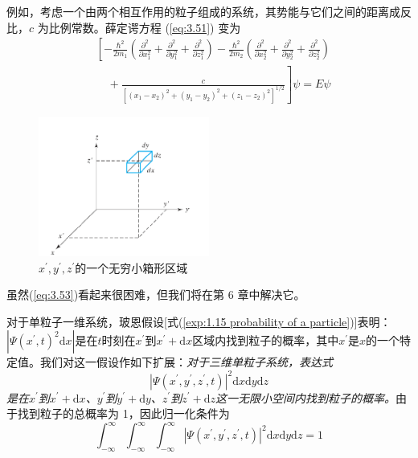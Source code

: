 	例如，考虑一个由两个相互作用的粒子组成的系统，其势能与它们之间的距离成反比，$c$ 为比例常数。薛定谔方程 (\ref{eq:3.51}) 变为
	\begin{equation}
		\begin{aligned}
			&\left[-\frac{\hbar^2}{2m_1}\left(\frac{\partial^2}{\partial x_1^2} + \frac{\partial^2}{\partial y_1^2} + \frac{\partial^2}{\partial z_1^2}\right) - \frac{\hbar^2}{2m_2}\left(\frac{\partial^2}{\partial x_2^2} + \frac{\partial^2}{\partial y_2^2} + \frac{\partial^2}{\partial z_2^2}\right) \right.\\
			&\quad + \left. \frac{c}{\left[\left(x_1-x_2\right)^2+\left(y_1-y_2\right)^2+\left(z_1-z_2\right)^2\right]^{1/2}}\right]\psi = E\psi
		\end{aligned}
		\label{eq:3.53}
	\end{equation}
	\begin{figure}[h!]
		\centering
		\includegraphics[width=0.5\textwidth]{Figures/3.1.png}  %
		\caption{$x^{\prime}, y^{\prime},z^{\prime}$的一个无穷小箱形区域}
		\label{fig:3.1}
	\end{figure}
	虽然(\ref{eq:3.53})看起来很困难，但我们将在第 6 章中解决它。

	对于单粒子一维系统，玻恩假设[式(\ref{exp:1.15 probability of a particle})]表明：$\left|\Psi\left(x^{\prime},t\right)^2\mathrm{d}x\right|$是在$t$时刻在$x^{\prime}$到$x^{\prime}+\mathrm{d}x$区域内找到粒子的概率，其中$x^{\prime}$是$x$的一个特定值。我们对这一假设作如下扩展：\textit{对于三维单粒子系统，表达式}
	\begin{equation}
		\boxed{
			\left|\Psi\left(x^{\prime}, y^{\prime}, z^{\prime},t\right)\right|^2 \mathrm{d}x\mathrm{d}y\mathrm{d}z
		}
		\label{exp:3.54}
	\end{equation}
	\textit{是在$x^{\prime}$到$x^{\prime}+\mathrm{d}x$、$y^{\prime}$到$y^{\prime}+\mathrm{d}y$、$z^{\prime}$到$z^{\prime}+\mathrm{d}z$这一无限小空间内找到粒子的概率。}由于找到粒子的总概率为 1，因此归一化条件为
	\begin{equation}
		\int_{-\infty}^{\infty}\int_{-\infty}^{\infty}\int_{-\infty}^{\infty}\left|\Psi\left(x^{\prime}, y^{\prime}, z^{\prime},t\right)\right|^2 \mathrm{d}x\mathrm{d}y\mathrm{d}z = 1
		\label{eq:3.55}
	\end{equation}

